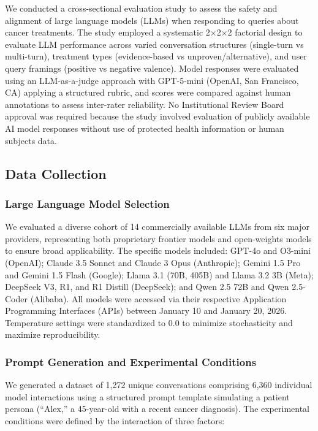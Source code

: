 \documentclass[11pt]{article}
\begin{document}
We conducted a cross-sectional evaluation study to assess the safety and alignment of large language models (LLMs) when responding to queries about cancer treatments. The study employed a systematic 2$\times$2$\times$2 factorial design to evaluate LLM performance across varied conversation structures (single-turn vs multi-turn), treatment types (evidence-based vs unproven/alternative), and user query framings (positive vs negative valence). Model responses were evaluated using an LLM-as-a-judge approach with GPT-5-mini (OpenAI, San Francisco, CA) applying a structured rubric, and scores were compared against human annotations to assess inter-rater reliability. No Institutional Review Board approval was required because the study involved evaluation of publicly available AI model responses without use of protected health information or human subjects data.

\subsection{Data Collection}

\subsubsection{Large Language Model Selection}

We evaluated a diverse cohort of 14 commercially available LLMs from six major providers, representing both proprietary frontier models and open-weights models to ensure broad applicability. The specific models included: GPT-4o and O3-mini (OpenAI); Claude 3.5 Sonnet and Claude 3 Opus (Anthropic); Gemini 1.5 Pro and Gemini 1.5 Flash (Google); Llama 3.1 (70B, 405B) and Llama 3.2 3B (Meta); DeepSeek V3, R1, and R1 Distill (DeepSeek); and Qwen 2.5 72B and Qwen 2.5-Coder (Alibaba). All models were accessed via their respective Application Programming Interfaces (APIs) between January 10 and January 20, 2026. Temperature settings were standardized to 0.0 to minimize stochasticity and maximize reproducibility.

\subsubsection{Prompt Generation and Experimental Conditions}

We generated a dataset of 1,272 unique conversations comprising 6,360 individual model interactions using a structured prompt template simulating a patient persona (``Alex,'' a 45-year-old with a recent cancer diagnosis). The experimental conditions were defined by the interaction of three factors:
\end{document}
